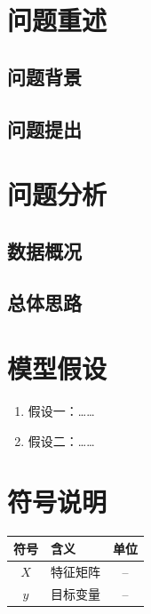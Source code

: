 \documentclass{MathorCupBigData}
\begin{document}
\makecover

\begin{abstract}
针对问题一，……（说明数据预处理与建模方法，给出关键数值结果）。

针对问题二，……（说明模型与求解算法，给出指标与对比）。

针对问题三，……（说明优化或预测方案，给出结论量级）。

本文模型在验证集上的主要指标为……，相对基线提升……。
\end{abstract}

\tableofcontents
\clearpage

\section{问题重述}
\subsection{问题背景}
\subsection{问题提出}

\section{问题分析}
\subsection{数据概况}
\subsection{总体思路}

\section{模型假设}
\begin{enumerate}
  \item 假设一：……
  \item 假设二：……
\end{enumerate}

\section{符号说明}
\begin{center}
\begin{tabular}{clc}
\toprule
符号 & 含义 & 单位 \\
\midrule
$X$ & 特征矩阵 & -- \\
$y$ & 目标变量 & -- \\
\bottomrule
\end{tabular}
\end{center}
\end{document}
